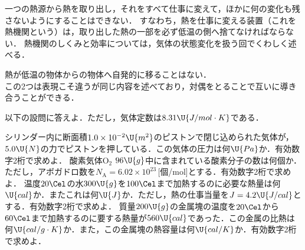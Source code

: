 一つの熱源から熱を取り出し，それを{\gtfamily すべて}仕事に変えて，ほかに何の変化も残さないようにすることはできない．
すなわち，熱を仕事に変える装置（これを{\gtfamily 熱機関}という）は，取り出した熱の一部を必ず低温の側へ捨てなければならない．
熱機関のしくみと効率については，気体の状態変化を扱う回でくわしく述べる．\\


熱が低温の物体からの物体へ自発的に移ることはない．\\

この2つは表現こそ違うが同じ内容を述べており，対偶をとることで互いに導き合うことができる．

\newpage

\setcounter{qno}{0}



\hspace{1zw}以下の設問に答えよ．ただし，気体定数は$8.31\U{J/mol\cdot K}$である．
\begin{komon}
 シリンダー内に断面積$1.0\times 10^{-2}\U{m^2}$のピストンで閉じ込められた気体が，$5.0\U{N}$の力でピストンを押している．この気体の圧力は何$\U{Pa}$か．有効数字2桁で求めよ．
 酸素気体$\mathrm{O_2}$ $96\U{g}$中に含まれている酸素分子の数は何個か．ただし，アボガドロ数を$N_{\mathrm{A}}=6.02\times 10^{23}$\,[個/mol]とする．有効数字2桁で求めよ．
 温度$20\Cel$の水$300\U{g}$を$100\Cel$まで加熱するのに必要な熱量は何$\U{cal}$か．またこれは何$\U{J}$か．ただし，熱の仕事当量を$J=4.2\U{J/cal}$とする．有効数字2桁で求めよ．
 質量$200\U{g}$の金属塊の温度を$20\Cel$から$60\Cel$まで加熱するのに要する熱量が$560\U{cal}$であった．この金属の比熱は何$\U{cal/g\cdot K}$か．また，この金属塊の熱容量は何$\U{cal/K}$か．有効数字2桁で求めよ．
\end{komon}

